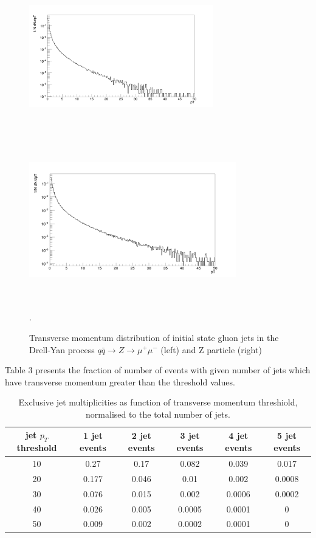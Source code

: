 \documentclass[12pt,a4paper]{article}		%
\begin{document}
\begin{figure}[h]
	\begin{center}
		\includegraphics[width=80mm,height=70mm]{jetpt.png} \includegraphics[width=90mm,height=70mm]{zetpt.png} 
		\caption{Transverse momentum distribution of initial state gluon jets in the Drell-Yan process $q\bar{q} \to Z \to \mu^+\mu^-$ (left) and Z particle (right)}.  					
	\end{center}
	\label{fig:zjets}
\end{figure}

Table 3 presents the fraction of number of events with given number of jets which have transverse momentum greater than the threshold values. 

\begin{table}
\begin{center}
\caption{Exclusive jet multiplicities as function of transverse momentum threshiold, normalised to the total number of jets.}
	\begin{tabular}{|c|c|c|c|c|c|}
		\hline
	jet $p_T$ threshold & 1 jet events& 2 jet events& 3 jet events & 4 jet events & 5 jet events \\
		\hline
	10 & 0.27 & 0.17 & 0.082 & 0.039& 0.017\\
	\hline
	20 & 0.177 & 0.046 & 0.01 & 0.002 & 0.0008\\
	\hline
	30 & 0.076 & 0.015 & 0.002 & 0.0006 & 0.0002\\
	\hline
	40 & 0.026 & 0.005 & 0.0005 & 0.0001 & 0\\
	\hline				
	50 & 0.009 & 0.002 & 0.0002 & 0.0001 & 0\\
	\hline
	\end{tabular}
\end{center}
\label{tab:jmult}
\end{table}
\end{document}
